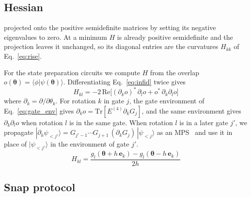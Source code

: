 \subsection{Hessian}

projected onto the positive semidefinite matrices by setting its negative eigenvalues to zero. At a minimum $H$ is already positive semidefinite and the projection leaves it unchanged, so its diagonal entries are the curvatures $H_{kk}$ of Eq.~\eqref{eq:rise}.

For the state preparation circuits we compute $H$ from the overlap $o(\boldsymbol{\theta}) = \langle \phi | \psi(\boldsymbol{\theta}) \rangle$. Differentiating Eq.~\eqref{eq:infid} twice gives
\begin{equation}
H_{kl} = -2\, \mathrm{Re}\big[ (\partial_k o)^{*}\, \partial_l o + o^{*}\, \partial_k \partial_l o \big]
\label{eq:hess_overlap}
\end{equation}
where $\partial_k = \partial / \partial\theta_k$. For rotation $k$ in gate $j$, the gate environment of Eq.~\eqref{eq:gate_env} gives $\partial_k o = \mathrm{Tr}[E^{(4)} \partial_k G_j]$, and the same environment gives $\partial_k \partial_l o$ when rotation $l$ is in the same gate. When rotation $l$ is in a later gate $j'$, we propagate $|\partial_k \psi_{<j'}\rangle = G_{j'-1} \cdots G_{j+1}\, (\partial_k G_j)\, |\psi_{<j}\rangle$ as an MPS~\cite{Schollwock2011} and use it in place of $|\psi_{<j'}\rangle$ in the environment of gate $j'$. %
\begin{equation}
H_{kl} = \frac{g_l(\boldsymbol{\theta} + h\, \mathbf{e}_k) - g_l(\boldsymbol{\theta} - h\, \mathbf{e}_k)}{2h}
\label{eq:hess_fd}
\end{equation}

\subsection{Snap protocol}

